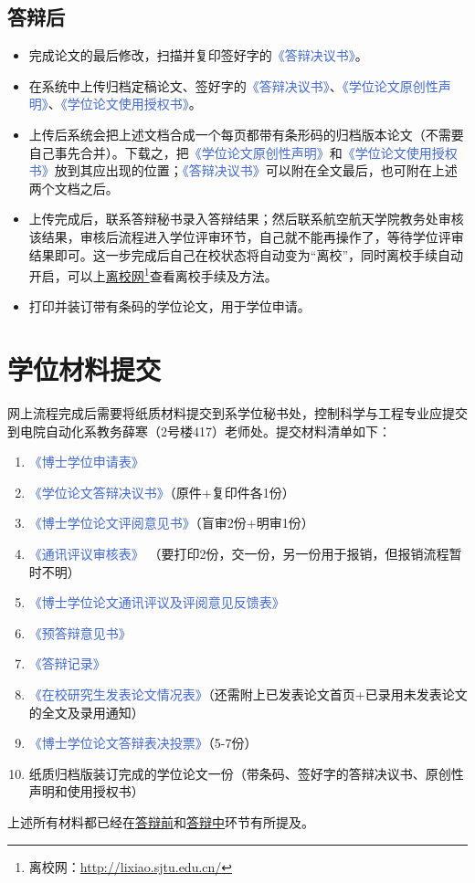 \documentclass[a4paper, 12pt]{ctexart}
\newcommand{\form}[1]{\textcolor{RoyalBlue}{《#1》}}
\begin{document}
\subsection{答辩后}
    \begin{itemize}
        \item 完成论文的最后修改，扫描并复印签好字的\form{答辩决议书}。
        \item 在系统中上传归档定稿论文、签好字的\form{答辩决议书}、\form{学位论文原创性声明}、\form{学位论文使用授权书}。
        \item 上传后系统会把上述文档合成一个每页都带有条形码的归档版本论文（不需要自己事先合并）。下载之，把\form{学位论文原创性声明}和\form{学位论文使用授权书}放到其应出现的位置；\form{答辩决议书}可以附在全文最后，也可附在上述两个文档之后。
        \item 上传完成后，联系答辩秘书录入答辩结果；然后联系航空航天学院教务处审核该结果，审核后流程进入学位评审环节，自己就不能再操作了，等待学位评审结果即可。这一步完成后自己在校状态将自动变为“离校”，同时离校手续自动开启，可以上\href{http://lixiao.sjtu.edu.cn/}{离校网}\footnote{离校网：\url{http://lixiao.sjtu.edu.cn/}}查看离校手续及方法。
        \item 打印并装订带有条码的学位论文，用于学位申请。
    \end{itemize}

\section{学位材料提交}
网上流程完成后需要将纸质材料提交到系学位秘书处，控制科学与工程专业应提交到电院自动化系教务薛寒（2号楼417）老师处。提交材料清单如下：
\begin{enumerate}
    \item \form{博士学位申请表}
    \item \form{学位论文答辩决议书}（原件+复印件各1份）
    \item \form{博士学位论文评阅意见书}（盲审2份+明审1份）
    \item \form{通讯评议审核表} （要打印2份，交一份，另一份用于报销，但报销流程暂时不明）
    \item \form{博士学位论文通讯评议及评阅意见反馈表}
    \item \form{预答辩意见书}
    \item \form{答辩记录}
    \item \form{在校研究生发表论文情况表}（还需附上已发表论文首页+已录用未发表论文的全文及录用通知）
    \item \form{博士学位论文答辩表决投票}（5-7份）
    \item 纸质归档版装订完成的学位论文一份（带条码、签好字的答辩决议书、原创性声明和使用授权书）
\end{enumerate}
上述所有材料都已经在\hyperlink{dbq}{答辩前}和\hyperlink{dbz}{答辩中}环节有所提及。
\end{document}
